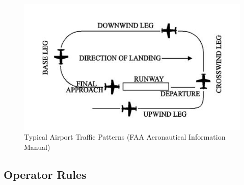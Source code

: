 \documentclass[
  12pt,
]{book}
\begin{document}
\begin{figure}

{\centering \includegraphics[width=0.6\linewidth]{images/faa_traffic_pattern} 

}

\caption{Typical Airport Traffic Patterns (FAA Aeronautical Information Manual)}\label{fig:traffic-patterns}
\end{figure}

\subsection{Operator Rules}\label{operator-rules}
\end{document}
